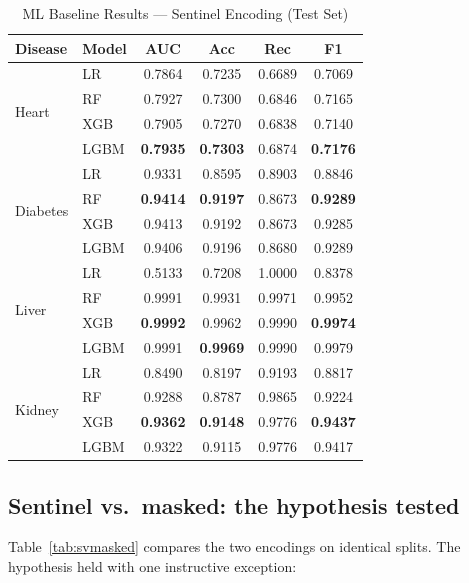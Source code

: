 \documentclass[journal]{IEEEtran}
\begin{document}
\begin{table}[t]
\centering
\caption{ML Baseline Results --- Sentinel Encoding (Test Set)}
\label{tab:sentinel}
\footnotesize
\begin{tabular}{llcccc}
\toprule
\textbf{Disease} & \textbf{Model} & \textbf{AUC} & \textbf{Acc} & \textbf{Rec} & \textbf{F1} \\
\midrule
\multirow{4}{*}{Heart}
 & LR   & 0.7864 & 0.7235 & 0.6689 & 0.7069 \\
 & RF   & 0.7927 & 0.7300 & 0.6846 & 0.7165 \\
 & XGB  & 0.7905 & 0.7270 & 0.6838 & 0.7140 \\
 & LGBM & \textbf{0.7935} & \textbf{0.7303} & 0.6874 & \textbf{0.7176} \\
\midrule
\multirow{4}{*}{Diabetes}
 & LR   & 0.9331 & 0.8595 & 0.8903 & 0.8846 \\
 & RF   & \textbf{0.9414} & \textbf{0.9197} & 0.8673 & \textbf{0.9289} \\
 & XGB  & 0.9413 & 0.9192 & 0.8673 & 0.9285 \\
 & LGBM & 0.9406 & 0.9196 & 0.8680 & 0.9289 \\
\midrule
\multirow{4}{*}{Liver}
 & LR   & 0.5133 & 0.7208 & 1.0000 & 0.8378 \\
 & RF   & 0.9991 & 0.9931 & 0.9971 & 0.9952 \\
 & XGB  & \textbf{0.9992} & 0.9962 & 0.9990 & \textbf{0.9974} \\
 & LGBM & 0.9991 & \textbf{0.9969} & 0.9990 & 0.9979 \\
\midrule
\multirow{4}{*}{Kidney}
 & LR   & 0.8490 & 0.8197 & 0.9193 & 0.8817 \\
 & RF   & 0.9288 & 0.8787 & 0.9865 & 0.9224 \\
 & XGB  & \textbf{0.9362} & \textbf{0.9148} & 0.9776 & \textbf{0.9437} \\
 & LGBM & 0.9322 & 0.9115 & 0.9776 & 0.9417 \\
\bottomrule
\end{tabular}
\end{table}

\subsection{Sentinel vs.\ masked: the hypothesis tested}
Table~\ref{tab:svmasked} compares the two encodings on identical splits. The hypothesis held with one instructive exception:
\end{document}
